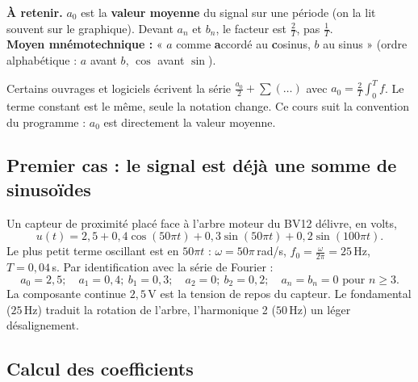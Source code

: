 \documentclass[a4paper,11pt]{article}
\begin{document}
\begin{tcolorbox}[colback=white, colframe=uimmblue, boxrule=0.8pt, arc=3pt]
\textbf{À retenir.} \quad $a_0$ est la \textbf{valeur moyenne} du signal sur une période (on la lit souvent sur le graphique). \quad Devant $a_n$ et $b_n$, le facteur est $\frac{2}{T}$, pas $\frac1T$.\\
\textbf{Moyen mnémotechnique :} « $a$ comme \textbf{a}ccordé au \textbf{c}osinus, $b$ au sinus » (ordre alphabétique : $a$ avant $b$, $\cos$ avant $\sin$).
\end{tcolorbox}

\begin{remarque}
Certains ouvrages et logiciels écrivent la série $\frac{a_0}{2} + \sum(\dots)$ avec $a_0 = \frac2T\int_0^T f$. Le terme constant est le même, seule la notation change. Ce cours suit la convention du programme : $a_0$ est directement la valeur moyenne.
\end{remarque}

\subsection{Premier cas : le signal est déjà une somme de sinusoïdes}\label{subsec:lecture}

\begin{appliindus}\label{ex:lecture}
Un capteur de proximité placé face à l'arbre moteur du BV12 délivre, en volts,
\[
u(t) = 2{,}5 + 0{,}4\cos(50\pi t) + 0{,}3\sin(50\pi t) + 0{,}2\sin(100\pi t).
\]
Le plus petit terme oscillant est en $50\pi t$ : $\omega = 50\pi$\,rad/s, $f_0 = \frac{\omega}{2\pi} = 25$\,Hz, $T = 0{,}04$\,s. Par identification avec la série de Fourier :
\[
a_0 = 2{,}5 ; \quad a_1 = 0{,}4 ;\ b_1 = 0{,}3 ; \quad a_2 = 0 ;\ b_2 = 0{,}2 ; \quad a_n = b_n = 0 \text{ pour } n\geq 3.
\]
La composante continue $2{,}5$\,V est la tension de repos du capteur. Le fondamental ($25$\,Hz) traduit la rotation de l'arbre, l'harmonique 2 ($50$\,Hz) un léger désalignement.
\end{appliindus}

\subsection{Calcul des coefficients}\label{subsec:calcul}
\end{document}
